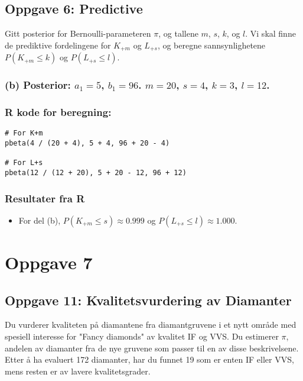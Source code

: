 \documentclass{article}
\begin{document}
\subsection{Oppgave 6: Predictive}

Gitt posterior for Bernoulli-parameteren \(\pi\), og tallene \(m\), \(s\), \(k\), og \(l\). Vi skal finne de prediktive fordelingene for \(K_{+m}\) og \(L_{+s}\), og beregne sannsynlighetene \(P(K_{+m} \leq k)\) og \(P(L_{+s} \leq l)\).

\subsubsection*{(b) Posterior: \(a_1 = 5\), \(b_1 = 96\). \(m = 20\), \(s = 4\), \(k = 3\), \(l = 12\).}
\subsubsection*{R kode for beregning:}
\begin{verbatim}
# For K+m
pbeta(4 / (20 + 4), 5 + 4, 96 + 20 - 4)

# For L+s
pbeta(12 / (12 + 20), 5 + 20 - 12, 96 + 12)
\end{verbatim}

\subsubsection*{Resultater fra R}
\begin{itemize}
    \item For del (b), \( P(K_{+m} \leq s) \approx 0.999 \) og \( P(L_{+s} \leq l) \approx 1.000 \).
\end{itemize}

\section{Oppgave 7}
\subsection{Oppgave 11: Kvalitetsvurdering av Diamanter}

Du vurderer kvaliteten på diamantene fra diamantgruvene i et nytt område med spesiell interesse for "Fancy diamonds" av kvalitet IF og VVS. Du estimerer \(\pi\), andelen av diamanter fra de nye gruvene som passer til en av disse beskrivelsene. Etter å ha evaluert 172 diamanter, har du funnet 19 som er enten IF eller VVS, mens resten er av lavere kvalitetsgrader.
\end{document}
